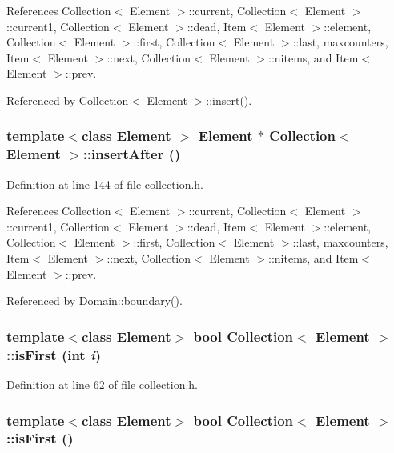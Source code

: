 References Collection$<$ Element $>$::current, Collection$<$ Element $>$::current1, Collection$<$ Element $>$::dead, Item$<$ Element $>$::element, Collection$<$ Element $>$::first, Collection$<$ Element $>$::last, maxcounters, Item$<$ Element $>$::next, Collection$<$ Element $>$::nitems, and Item$<$ Element $>$::prev.

Referenced by Collection$<$ Element $>$::insert().\hypertarget{classCollection_f0ec60d9037837a41b1090e1ce752bf8}{
\subsubsection[{insertAfter}]{\setlength{\rightskip}{0pt plus 5cm}template$<$class Element $>$ Element $\ast$ {\bf Collection}$<$ Element $>$::insertAfter ()}}
\label{classCollection_f0ec60d9037837a41b1090e1ce752bf8}




Definition at line 144 of file collection.h.

References Collection$<$ Element $>$::current, Collection$<$ Element $>$::current1, Collection$<$ Element $>$::dead, Item$<$ Element $>$::element, Collection$<$ Element $>$::first, Collection$<$ Element $>$::last, maxcounters, Item$<$ Element $>$::next, Collection$<$ Element $>$::nitems, and Item$<$ Element $>$::prev.

Referenced by Domain::boundary().\hypertarget{classCollection_2b74d7145a6497de50e7577a9e9bd8a0}{
\subsubsection[{isFirst}]{\setlength{\rightskip}{0pt plus 5cm}template$<$class Element$>$ bool {\bf Collection}$<$ Element $>$::isFirst (int {\em i})}}
\label{classCollection_2b74d7145a6497de50e7577a9e9bd8a0}




Definition at line 62 of file collection.h.\hypertarget{classCollection_3c644d87c5fe1109b3110c9bce5f55be}{
\subsubsection[{isFirst}]{\setlength{\rightskip}{0pt plus 5cm}template$<$class Element$>$ bool {\bf Collection}$<$ Element $>$::isFirst ()}}
\label{classCollection_3c644d87c5fe1109b3110c9bce5f55be}




